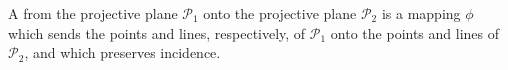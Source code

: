 A  from the projective plane $\mathcal{P}_1$ onto the projective plane $\mathcal{P}_2$ is a mapping $\phi$ which sends the points and lines, respectively, of $\mathcal{P}_1$ onto the points and lines of $\mathcal{P}_2$, and which preserves incidence.
